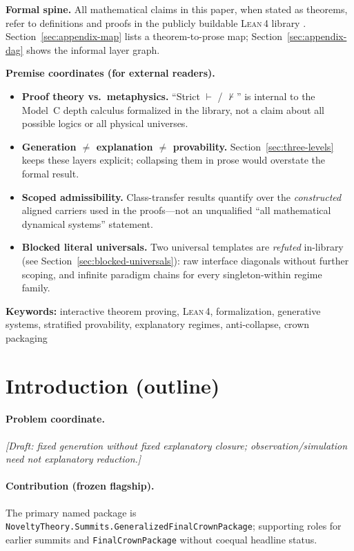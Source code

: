 \documentclass[11pt,a4paper]{article}
\newenvironment{keybox}[1]{%
  \Needspace*{8\baselineskip}%
  \begin{tcolorbox}[
    enhanced, breakable=false,
    colback=blue!5, colframe=blue!45!black, coltitle=black,
    colbacktitle=blue!14, boxrule=0.85pt, arc=2.5pt,
    left=9pt, right=9pt, top=6pt, bottom=6pt,
    titlerule=0.55pt, fonttitle=\bfseries, title={#1},
    before upper=\raggedright,
    before skip=0.9\baselineskip, after skip=0.9\baselineskip
  ]%
}{%
  \end{tcolorbox}%
}
\theoremstyle{definition}
\newcommand{\lean}{\textsc{Lean}\,4}
\begin{document}
\begin{keybox}{Where disagreement can (and cannot) live}
\textbf{Formal spine.}
All mathematical claims in this paper, when stated as theorems, refer to
definitions and proofs in the publicly buildable \lean{} library
\cite{noveltyTheoryLean2026}. Section~\ref{sec:appendix-map} lists a
theorem-to-prose map; Section~\ref{sec:appendix-dag} shows the informal
layer graph.

\medskip
\textbf{Premise coordinates (for external readers).}
\begin{itemize}[leftmargin=2em]
\item \textbf{Proof theory vs.\ metaphysics.} ``Strict $\vdash$ / $\not\vdash$'' is
  internal to the Model~C depth calculus formalized in the library, not a claim
  about all possible logics or all physical universes.
\item \textbf{Generation $\neq$ explanation $\neq$ provability.} Section~\ref{sec:three-levels}
  keeps these layers explicit; collapsing them in prose would overstate the formal result.
\item \textbf{Scoped admissibility.} Class-transfer results quantify over the
  \emph{constructed} aligned carriers used in the proofs---not an
  unqualified ``all mathematical dynamical systems'' statement.
\item \textbf{Blocked literal universals.} Two universal templates are
  \emph{refuted} in-library (see Section~\ref{sec:blocked-universals}): raw
  interface diagonals without further scoping, and infinite paradigm chains for every
  singleton-within regime family.
\end{itemize}
\end{keybox}

\noindent\textbf{Keywords:}
interactive theorem proving, \lean, formalization, generative systems,
stratified provability, explanatory regimes, anti-collapse, crown packaging

\section{Introduction (outline)}\label{sec:intro}

\paragraph{Problem coordinate.}
\emph{[Draft: fixed generation without fixed explanatory closure; observation/simulation need not explanatory reduction.]}

\paragraph{Contribution (frozen flagship).}
The primary named package is
\texttt{NoveltyTheory.Summits.GeneralizedFinalCrownPackage}; supporting roles for earlier summits and \texttt{FinalCrownPackage} without coequal headline status.
\end{document}
